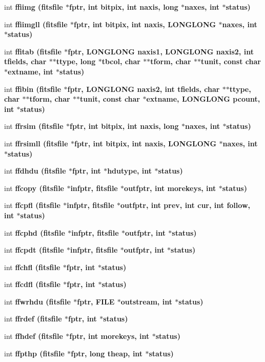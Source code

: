 \begin{CompactItemize}
\item 
int \bf{ffiimg} (\bf{fitsfile} $\ast$fptr, int bitpix, int naxis, long $\ast$naxes, int $\ast$status)
\item 
int \bf{ffiimgll} (\bf{fitsfile} $\ast$fptr, int bitpix, int naxis, \bf{LONGLONG} $\ast$naxes, int $\ast$status)
\item 
int \bf{ffitab} (\bf{fitsfile} $\ast$fptr, \bf{LONGLONG} naxis1, \bf{LONGLONG} naxis2, int tfields, char $\ast$$\ast$ttype, long $\ast$tbcol, char $\ast$$\ast$tform, char $\ast$$\ast$tunit, const char $\ast$extname, int $\ast$status)
\item 
int \bf{ffibin} (\bf{fitsfile} $\ast$fptr, \bf{LONGLONG} naxis2, int tfields, char $\ast$$\ast$ttype, char $\ast$$\ast$tform, char $\ast$$\ast$tunit, const char $\ast$extname, \bf{LONGLONG} pcount, int $\ast$status)
\item 
int \bf{ffrsim} (\bf{fitsfile} $\ast$fptr, int bitpix, int naxis, long $\ast$naxes, int $\ast$status)
\item 
int \bf{ffrsimll} (\bf{fitsfile} $\ast$fptr, int bitpix, int naxis, \bf{LONGLONG} $\ast$naxes, int $\ast$status)
\item 
int \bf{ffdhdu} (\bf{fitsfile} $\ast$fptr, int $\ast$\bf{hdutype}, int $\ast$status)
\item 
int \bf{ffcopy} (\bf{fitsfile} $\ast$infptr, \bf{fitsfile} $\ast$outfptr, int morekeys, int $\ast$status)
\item 
int \bf{ffcpfl} (\bf{fitsfile} $\ast$infptr, \bf{fitsfile} $\ast$outfptr, int prev, int cur, int follow, int $\ast$status)
\item 
int \bf{ffcphd} (\bf{fitsfile} $\ast$infptr, \bf{fitsfile} $\ast$outfptr, int $\ast$status)
\item 
int \bf{ffcpdt} (\bf{fitsfile} $\ast$infptr, \bf{fitsfile} $\ast$outfptr, int $\ast$status)
\item 
int \bf{ffchfl} (\bf{fitsfile} $\ast$fptr, int $\ast$status)
\item 
int \bf{ffcdfl} (\bf{fitsfile} $\ast$fptr, int $\ast$status)
\item 
int \bf{ffwrhdu} (\bf{fitsfile} $\ast$fptr, FILE $\ast$outstream, int $\ast$status)
\item 
int \bf{ffrdef} (\bf{fitsfile} $\ast$fptr, int $\ast$status)
\item 
int \bf{ffhdef} (\bf{fitsfile} $\ast$fptr, int morekeys, int $\ast$status)
\item 
int \bf{ffpthp} (\bf{fitsfile} $\ast$fptr, long theap, int $\ast$status)
\item 

\end{CompactItemize}
